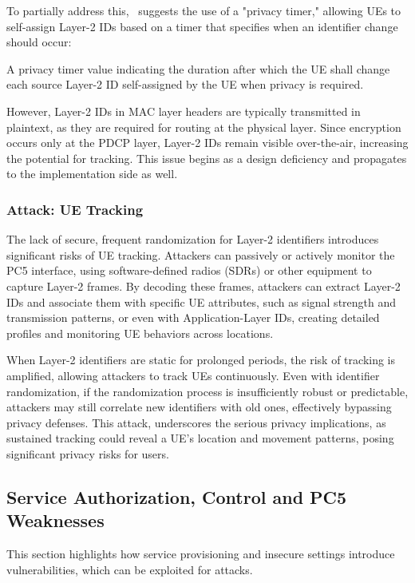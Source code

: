 To partially address this,~\cite{3gpp.23.287} suggests the use of a "privacy timer," allowing UEs to self-assign Layer-2 IDs based on a timer that specifies when an identifier change should occur:

\begin{fancyquote}[]
A privacy timer value indicating the duration after which the UE shall change each source Layer-2 ID self-assigned by the UE when privacy is required.
\end{fancyquote}

However, Layer-2 IDs in MAC layer headers are typically transmitted in plaintext, as they are required for routing at the physical layer. Since encryption occurs only at the PDCP layer, Layer-2 IDs remain visible over-the-air, increasing the potential for tracking. This issue begins as a design deficiency and propagates to the implementation side as well.

\subsubsection{Attack: UE Tracking}

The lack of secure, frequent randomization for Layer-2 identifiers introduces significant risks of UE tracking. Attackers can passively or actively monitor the PC5 interface, using software-defined radios (SDRs) or other equipment to capture Layer-2 frames. By decoding these frames, attackers can extract Layer-2 IDs and associate them with specific UE attributes, such as signal strength and transmission patterns, or even with Application-Layer IDs, creating detailed profiles and monitoring UE behaviors across locations. 

When Layer-2 identifiers are static for prolonged periods, the risk of tracking is amplified, allowing attackers to track UEs continuously. Even with identifier randomization, if the randomization process is insufficiently robust or predictable, attackers may still correlate new identifiers with old ones, effectively bypassing privacy defenses. This attack, underscores the serious privacy implications, as sustained tracking could reveal a UE's location and movement patterns, posing significant privacy risks for users.

\subsection{Service Authorization, Control and PC5 Weaknesses}

This section highlights how service provisioning and insecure settings introduce vulnerabilities, which can be exploited for attacks.

